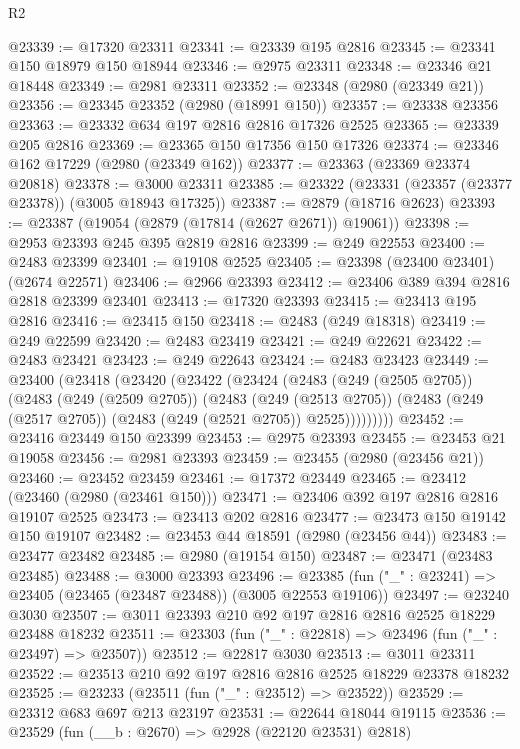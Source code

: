 \begin{lexlean}{R2}
\begin{coremodule}
@23339 := @17320 @23311
@23341 := @23339 @195 @2816
@23345 := @23341 @150 @18979 @150 @18944
@23346 := @2975 @23311
@23348 := @23346 @21 @18448
@23349 := @2981 @23311
@23352 := @23348 (@2980 (@23349 @21))
@23356 := @23345 @23352 (@2980 (@18991 @150))
@23357 := @23338 @23356
@23363 := @23332 @634 @197 @2816 @2816 @17326 @2525
@23365 := @23339 @205 @2816
@23369 := @23365 @150 @17356 @150 @17326
@23374 := @23346 @162 @17229 (@2980 (@23349 @162))
@23377 := @23363 (@23369 @23374 @20818)
@23378 := @3000 @23311
@23385 := @23322 (@23331 (@23357 (@23377 @23378)) (@3005 @18943 @17325))
@23387 := @2879 (@18716 @2623)
@23393 := @23387 (@19054 (@2879 (@17814 (@2627 @2671)) @19061))
@23398 := @2953 @23393 @245 @395 @2819 @2816
@23399 := @249 @22553
@23400 := @2483 @23399
@23401 := @19108 @2525
@23405 := @23398 (@23400 @23401) (@2674 @22571)
@23406 := @2966 @23393
@23412 := @23406 @389 @394 @2816 @2818 @23399 @23401
@23413 := @17320 @23393
@23415 := @23413 @195 @2816
@23416 := @23415 @150
@23418 := @2483 (@249 @18318)
@23419 := @249 @22599
@23420 := @2483 @23419
@23421 := @249 @22621
@23422 := @2483 @23421
@23423 := @249 @22643
@23424 := @2483 @23423
@23449 := @23400
    (@23418
      (@23420
        (@23422
          (@23424
            (@2483
              (@249 (@2505 @2705))
              (@2483
                (@249 (@2509 @2705))
                (@2483
                  (@249 (@2513 @2705))
                  (@2483 (@249 (@2517 @2705)) (@2483 (@249 (@2521 @2705)) @2525)))))))))
@23452 := @23416 @23449 @150 @23399
@23453 := @2975 @23393
@23455 := @23453 @21 @19058
@23456 := @2981 @23393
@23459 := @23455 (@2980 (@23456 @21))
@23460 := @23452 @23459
@23461 := @17372 @23449
@23465 := @23412 (@23460 (@2980 (@23461 @150)))
@23471 := @23406 @392 @197 @2816 @2816 @19107 @2525
@23473 := @23413 @202 @2816
@23477 := @23473 @150 @19142 @150 @19107
@23482 := @23453 @44 @18591 (@2980 (@23456 @44))
@23483 := @23477 @23482
@23485 := @2980 (@19154 @150)
@23487 := @23471 (@23483 @23485)
@23488 := @3000 @23393
@23496 := @23385 (fun ("_" : @23241) => @23405 (@23465 (@23487 @23488)) (@3005 @22553 @19106))
@23497 := @23240 @3030
@23507 := @3011 @23393 @210 @92 @197 @2816 @2816 @2525 @18229 @23488 @18232
@23511 := @23303 (fun ("_" : @22818) => @23496 (fun ("_" : @23497) => @23507))
@23512 := @22817 @3030
@23513 := @3011 @23311
@23522 := @23513 @210 @92 @197 @2816 @2816 @2525 @18229 @23378 @18232
@23525 := @23233 (@23511 (fun ("_" : @23512) => @23522))
@23529 := @23312 @683 @697 @213 @23197
@23531 := @22644 @18044 @19115
@23536 := @23529 (fun (__b : @2670) => @2928 (@22120 @23531) @2818)

\end{coremodule}
\end{lexlean}
